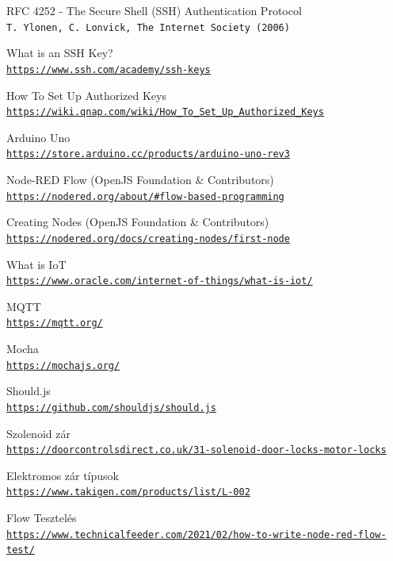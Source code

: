 \documentclass[
]{thesis-ekf}
\theoremstyle{definition}
\theoremstyle{remark}
\begin{document}
\begin{thebibliography}{2}
 RFC 4252 - The Secure Shell (SSH) Authentication Protocol
    \\\texttt{T. Ylonen, C. Lonvick, The Internet Society (2006)}

 What is an SSH Key?
    \\\texttt{\url{https://www.ssh.com/academy/ssh-keys}}

 How To Set Up Authorized Keys
    \\\texttt{\url{https://wiki.qnap.com/wiki/How\_To\_Set\_Up\_Authorized\_Keys}}

 Arduino Uno
    \\\texttt{\url{https://store.arduino.cc/products/arduino-uno-rev3}}

 Node-RED Flow (OpenJS Foundation \& Contributors)
    \\\texttt{\url{https://nodered.org/about/\#flow-based-programming}}

 Creating Nodes (OpenJS Foundation \& Contributors)
    \\\texttt{\url{https://nodered.org/docs/creating-nodes/first-node}}

 What is IoT
    \\\texttt{\url{https://www.oracle.com/internet-of-things/what-is-iot/}}

 MQTT
    \\\texttt{\url{https://mqtt.org/}}

 Mocha
    \\\texttt{\url{https://mochajs.org/}}

 Should.js
    \\\texttt{\url{https://github.com/shouldjs/should.js}}

 Szolenoid zár
    \\\texttt{\url{https://doorcontrolsdirect.co.uk/31-solenoid-door-locks-motor-locks}}

 Elektromos zár típusok
    \\\texttt{\url{https://www.takigen.com/products/list/L-002}}

 Flow Tesztelés
    \\\texttt{\url{https://www.technicalfeeder.com/2021/02/how-to-write-node-red-flow-test/}}
    
\end{thebibliography}


\end{document}
